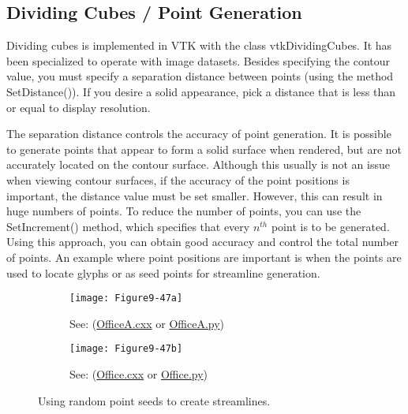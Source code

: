 \subsection{Dividing Cubes / Point Generation}

Dividing cubes is implemented in VTK with the class vtkDividingCubes. It has been specialized to operate with image datasets. Besides specifying the contour value, you must specify a separation distance between points (using the method SetDistance()). If you desire a solid appearance, pick a distance that is less than or equal to display resolution.

The separation distance controls the accuracy of point generation. It is possible to generate points that appear to form a solid surface when rendered, but are not accurately located on the contour surface. Although this usually is not an issue when viewing contour surfaces, if the accuracy of the point positions is important, the distance value must be set smaller. However, this can result in huge numbers of points. To reduce the number of points, you can use the SetIncrement() method, which specifies that every $n^{th}$ point is to be generated. Using this approach, you can obtain good accuracy and control the total number of points. An example where point positions are important is when the points are used to locate glyphs or as seed points for streamline generation.

\begin{figure}[htb]
	\begin{subfigure}[h]{0.48\linewidth}
		\texttt{[image: Figure9-47a]}
		\captionsetup{justification=centering}
		\caption*{See: (\href{https://lorensen.github.io/VTKExamples/site/Cxx/VisualizationAlgorithms/OfficeA/}{OfficeA.cxx} or \href{https://lorensen.github.io/VTKExamples/site/Python/VisualizationAlgorithms/OfficeA/}{OfficeA.py})}
		\label{fig:Figure9-47a}
	\end{subfigure}
	\hfill
	\begin{subfigure}[h]{0.48\linewidth}
		\texttt{[image: Figure9-47b]}
		\captionsetup{justification=centering}
		\caption*{See: (\href{https://lorensen.github.io/VTKExamples/site/Cxx/VisualizationAlgorithms/Office/}{Office.cxx} or \href{https://lorensen.github.io/VTKExamples/site/Python/VisualizationAlgorithms/Office/}{Office.py})}
		\label{fig:Figure9-47b}
	\end{subfigure}
	\caption{Using random point seeds to create streamlines.}\label{fig:Figure9-47}
\end{figure}

